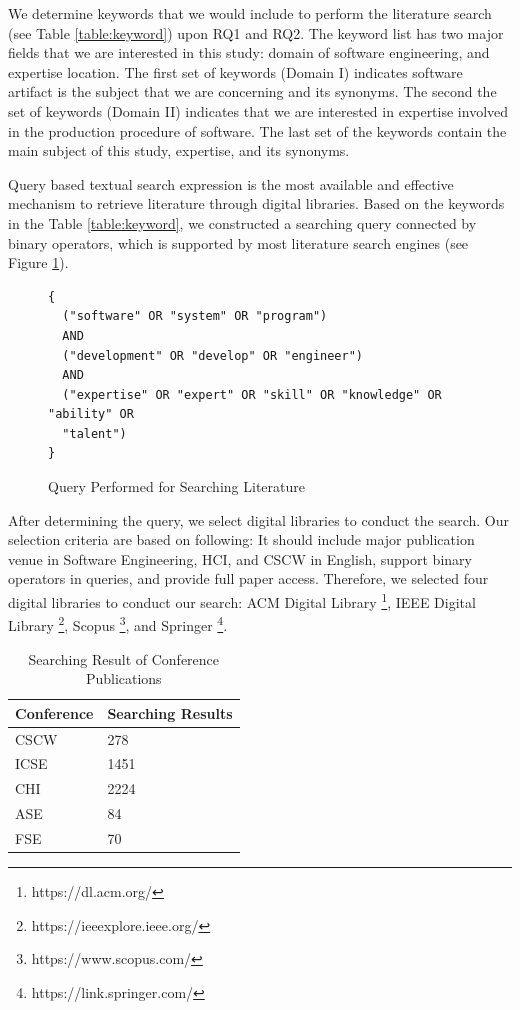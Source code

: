 We determine keywords that we would include to perform the literature search (see Table \ref{table:keyword}) upon RQ1 and RQ2. The keyword list has two major fields that we are interested in this study: domain of software engineering, and expertise location. The first set of keywords (Domain I) indicates software artifact is the subject that we are concerning and its synonyms. The second the set of keywords (Domain II) indicates that we are interested in expertise involved in the production procedure of software. The last set of the keywords contain the main subject of this study, expertise, and its synonyms.

Query based textual search expression is the most available and effective mechanism to retrieve literature through digital libraries. Based on the keywords in the Table \ref{table:keyword}, we constructed a searching query connected by binary operators, which is supported by most literature search engines (see Figure \ref{fig:query}). 

\begin{figure}
\begin{verbatim}
{
  ("software" OR "system" OR "program") 
  AND 
  ("development" OR "develop" OR "engineer") 
  AND 
  ("expertise" OR "expert" OR "skill" OR "knowledge" OR "ability" OR 
  "talent")
}
\end{verbatim}
  \caption{Query Performed for Searching Literature}
  \label{fig:query}
\end{figure}

After determining the query, we select digital libraries to conduct the search. Our selection criteria are based on following: It should include major publication venue in Software Engineering, HCI, and CSCW in English, support binary operators in queries, and provide full paper access. Therefore, we selected four digital libraries to conduct our search: ACM Digital Library \footnote{https://dl.acm.org/}, IEEE Digital Library \footnote{https://ieeexplore.ieee.org/}, Scopus \footnote{https://www.scopus.com/}, and Springer \footnote{https://link.springer.com/}.

\begin{table}[tbp]
\centering
\begin{tabular}{l l}
\hline
\textbf{Conference} & \textbf{Searching Results} \\ \hline
CSCW       & 278               \\ 
ICSE       & 1451              \\ 
CHI        & 2224              \\ 
ASE        & 84                \\
FSE        & 70                \\ \hline
\end{tabular}
\caption{Searching Result of Conference Publications}
\label{table:searching_conf}
\end{table}

